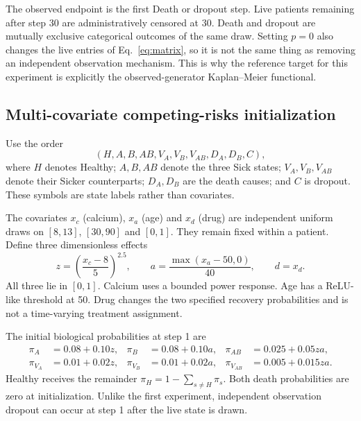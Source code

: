 The observed endpoint is the first Death or dropout step. Live patients remaining after step 30 are administratively censored at 30. Death and dropout are mutually exclusive categorical outcomes of the same draw. Setting $p=0$ also changes the live entries of Eq.~\eqref{eq:matrix}, so it is not the same thing as removing an independent observation mechanism. This is why the reference target for this experiment is explicitly the observed-generator Kaplan--Meier functional.

\subsection{Multi-covariate competing-risks initialization}
Use the order
\[
(H,A,B,AB,V_A,V_B,V_{AB},D_A,D_B,C),
\]
where $H$ denotes Healthy; $A,B,AB$ denote the three Sick states; $V_A,V_B,V_{AB}$ denote their Sicker counterparts; $D_A,D_B$ are the death causes; and $C$ is dropout. These symbols are state labels rather than covariates.

The covariates $x_c$ (calcium), $x_a$ (age) and $x_d$ (drug) are independent uniform draws on $[8,13]$, $[30,90]$ and $[0,1]$. They remain fixed within a patient. Define three dimensionless effects
\begin{equation}\label{eq:crcovariates}
z=\left(\frac{x_c-8}{5}\right)^{2.5},\qquad
a=\frac{\max(x_a-50,0)}{40},\qquad d=x_d.
\end{equation}
All three lie in $[0,1]$. Calcium uses a bounded power response. Age has a ReLU-like threshold at 50. Drug changes the two specified recovery probabilities and is not a time-varying treatment assignment.

The initial biological probabilities at step 1 are
\begin{align*}
\pi_A&=0.08+0.10z,&\pi_B&=0.08+0.10a,&\pi_{AB}&=0.025+0.05za,\\
\pi_{V_A}&=0.01+0.02z,&\pi_{V_B}&=0.01+0.02a,&\pi_{V_{AB}}&=0.005+0.015za.
\end{align*}
Healthy receives the remainder $\pi_H=1-\sum_{s\ne H}\pi_s$. Both death probabilities are zero at initialization. Unlike the first experiment, independent observation dropout can occur at step 1 after the live state is drawn.


